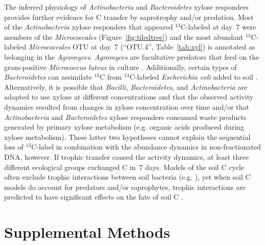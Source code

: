\documentclass{article}
\begin{document}
The inferred physiology of \textit{Actinobacteria} and \textit{Bacteroidetes}
xylose responders provides further evidence for C transfer by
saprotrophy and/or predation. Most of the \textit{Actinobacteria} xylose
responders that appeared $^{13}$C-labeled at day~7 were members of the
\textit{Micrococcales} (Figure~\ref{fig:tiledtree}) and the most abundant
$^{13}$C-labeled \textit{Micrococcales} OTU at day~7 (“OTU.4”,
Table~\ref{tab:xyl}) is annotated as belonging in the \textit{Agromyces}.
\textit{Agromyces} are facultative predators that feed on the gram-positive
\textit{Micrococcus luteus} in culture \citep{16346402}. Additionally, certain types
of \textit{Bacteroidetes} can assimilate $^{13}$C from $^{13}$C-labeled
\textit{Escherichia coli} added to soil \citep{Lueders2006}.
Alternatively, it is possible that \textit{Bacilli},
\textit{Bacteroidetes}, and \textit{Actinobacteria} are adapted to use
xylose at different concentrations and that the observed activity dynamics
resulted from changes in xylose concentration over time and/or that
\textit{Actinobacteria} and \textit{Bacteroidetes} xylose responders
consumed waste products generated by primary xylose metabolism (e.g.
organic acids produced during xylose metabolism). These latter two
hypotheses cannot explain the sequential loss of $^{13}$C-label in combination
with the abundance dynamics in non-fractionated DNA, however.
If trophic transfer caused the activity dynamics, at least three different
ecological groups exchanged C in~7 days. Models of the soil C cycle often
exclude trophic interactions between soil bacteria (e.g.
\citep{Moore1988}), yet when soil C models do account for predators and/or
saprophytes, trophic interactions are predicted to have significant
effects on the fate of soil C \citep{Kaiser2014a}. 

\section{Supplemental Methods} 
\end{document}
